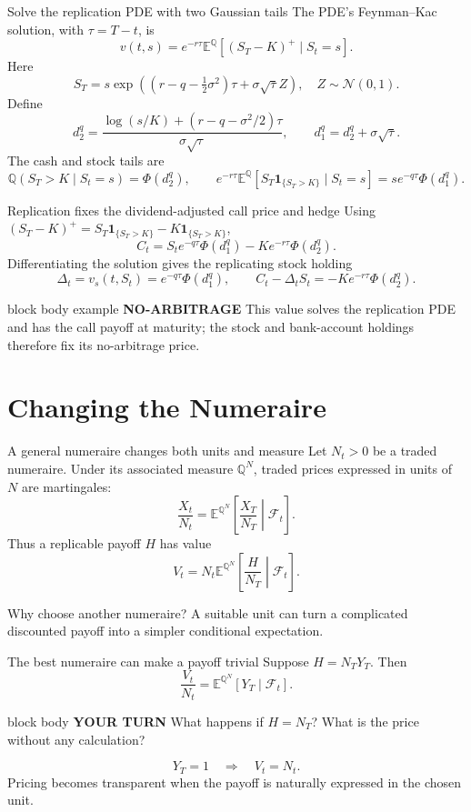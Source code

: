 \documentclass[handout,10pt,aspectratio=169]{beamer}
\newenvironment{marketbox}{\begin{beamercolorbox}[rounded=true,sep=0.7em,wd=\textwidth]{block body example}
  \textbf{\color{CourseGreen}NO-ARBITRAGE}\quad}{\end{beamercolorbox}}
\newenvironment{pausebox}{\begin{beamercolorbox}[rounded=true,sep=0.8em,wd=\textwidth]{block body}
  \textbf{\color{CourseGold}YOUR TURN}\quad}{\end{beamercolorbox}}
\newcommand{\E}{\mathbb E}
\newcommand{\Q}{\mathbb Q}
\newcommand{\cF}{\mathcal F}
\newcommand{\1}{\mathbf 1}
\newcommand{\Nlaw}{\mathcal N}
\begin{document}
\begin{frame}{Solve the replication PDE with two Gaussian tails}
The PDE's Feynman--Kac solution, with \(\tau=T-t\), is
\[
v(t,s)=e^{-r\tau}\E^\Q[(S_T-K)^+\mid S_t=s].
\]
Here
\[
S_T=s\exp\!\left((r-q-\tfrac12\sigma^2)\tau+\sigma\sqrt\tau Z\right),
\quad Z\sim\Nlaw(0,1).
\]
Define
\[
d_2^q=\frac{\log(s/K)+(r-q-\sigma^2/2)\tau}{\sigma\sqrt\tau},
\qquad d_1^q=d_2^q+\sigma\sqrt\tau.
\]
The cash and stock tails are
\[
\Q(S_T>K\mid S_t=s)=\Phi(d_2^q),
\qquad
e^{-r\tau}\E^\Q[S_T\1_{\{S_T>K\}}\mid S_t=s]
=se^{-q\tau}\Phi(d_1^q).
\]
\end{frame}

\begin{frame}{Replication fixes the dividend-adjusted call price and hedge}
Using \((S_T-K)^+=S_T\1_{\{S_T>K\}}-K\1_{\{S_T>K\}}\),
\[
\boxed{C_t=S_te^{-q\tau}\Phi(d_1^q)-Ke^{-r\tau}\Phi(d_2^q).}
\]
Differentiating the solution gives the replicating stock holding
\[
\boxed{\Delta_t=v_s(t,S_t)=e^{-q\tau}\Phi(d_1^q),}
\qquad
C_t-\Delta_tS_t=-Ke^{-r\tau}\Phi(d_2^q).
\]
\begin{marketbox}
This value solves the replication PDE and has the call payoff at maturity;
the stock and bank-account holdings therefore fix its no-arbitrage price.
\end{marketbox}
\end{frame}

\section{Changing the Numeraire}

\begin{frame}{A general numeraire changes both units and measure}
Let \(N_t>0\) be a traded numeraire. Under its associated measure \(\Q^N\),
traded prices expressed in units of \(N\) are martingales:
\[
\frac{X_t}{N_t}
=\E^{\Q^N}\!\left[\frac{X_T}{N_T}\middle|\cF_t\right].
\]
Thus a replicable payoff \(H\) has value
\[
\boxed{
V_t=N_t\E^{\Q^N}\!\left[\frac{H}{N_T}\middle|\cF_t\right].}
\]
\begin{block}{Why choose another numeraire?}
A suitable unit can turn a complicated discounted payoff into a simpler
conditional expectation.
\end{block}
\end{frame}

\begin{frame}{The best numeraire can make a payoff trivial}
Suppose \(H=N_TY_T\). Then
\[
\frac{V_t}{N_t}
=\E^{\Q^N}[Y_T\mid\cF_t].
\]
\begin{pausebox}
What happens if \(H=N_T\)? What is the price without any calculation?
\end{pausebox}

\[
Y_T=1
\quad\Longrightarrow\quad
\boxed{V_t=N_t.}
\]
Pricing becomes transparent when the payoff is naturally expressed in the
chosen unit.
\end{frame}
\end{document}
